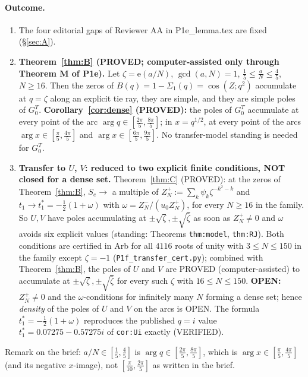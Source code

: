 \documentclass[11pt]{article}
\theoremstyle{definition}\newtheorem{definition}[theorem]{Definition}
\theoremstyle{remark}\newtheorem{remark}[theorem]{Remark}
\newcommand{\e}{\mathrm{e}}
\begin{document}
\paragraph{Outcome.}
\begin{enumerate}
\item[(A)] The four editorial gaps of Reviewer AA in P1e\_lemma.tex are fixed (\S\ref{sec:A}).
\item[(B)] \textbf{Theorem~\ref{thm:B} (PROVED; computer-assisted only through Theorem M of P1e).} Let $\zeta=\e(a/N)$, $\gcd(a,N)=1$, $\frac15\le\frac aN\le\frac45$, $N\ge16$. Then the zeros of $B(q)=1-\Sigma_1(q)=\cos(Z;q^2)$ accumulate at $q=\zeta$ along an explicit tie ray, they are simple, and they are simple poles of $G^T_0$.
\textbf{Corollary~\ref{cor:dense} (PROVED):} the poles of $G^T_0$ accumulate at every point of the arc $\arg q\in[\frac{2\pi}5,\frac{8\pi}5]$; in $x=q^{1/2}$, at every point of the arcs $\arg x\in[\frac\pi5,\frac{4\pi}5]$ and $\arg x\in[\frac{6\pi}5,\frac{9\pi}5]$. No transfer-model standing is needed for $G^T_0$.
\item[(C)] \textbf{Transfer to $U$, $V$: reduced to two explicit finite conditions, NOT closed for a dense set.} Theorem~\ref{thm:C} (PROVED): at the zeros of Theorem~\ref{thm:B}, $S_e\to$ a multiple of $Z^+_N:=\sum_k\psi_k\zeta^{-k^2-k}$ and $t_1\to t_1^*=-\frac12(1+\omega)$ with $\omega=Z^-_N/(u_0Z^+_N)$, for every $N\ge16$ in the family. So $U,V$ have poles accumulating at $\pm\sqrt\zeta,\pm\sqrt{\bar\zeta}$ as soon as $Z^+_N\neq0$ and $\omega$ avoids six explicit values (standing: Theorems \texttt{thm:model}, \texttt{thm:RJ}). Both conditions are certified in Arb for all $4116$ roots of unity with $3\le N\le150$ in the family except $\zeta=-1$ (\texttt{P1f\_transfer\_cert.py}); combined with Theorem~\ref{thm:B}, the poles of $U$ and $V$ are PROVED (computer-assisted) to accumulate at $\pm\sqrt\zeta,\pm\sqrt{\bar\zeta}$ for every such $\zeta$ with $16\le N\le150$.
\textbf{OPEN:} $Z^+_N\ne0$ and the $\omega$-conditions for infinitely many $N$ forming a dense set; hence \emph{density} of the poles of $U$ and $V$ on the arcs is OPEN. The formula $t_1^*=-\frac12(1+\omega)$ reproduces the published $q=i$ value $t_1^*=0.07275-0.57275i$ of \texttt{cor:Ui} exactly (VERIFIED).
\end{enumerate}
Remark on the brief: $a/N\in[\frac15,\frac45]$ is $\arg q\in[\frac{2\pi}5,\frac{8\pi}5]$, which is $\arg x\in[\frac\pi5,\frac{4\pi}5]$ (and its negative $x$-image), not $[\frac\pi{10},\frac{2\pi}5]$ as written in the brief.
\end{document}
